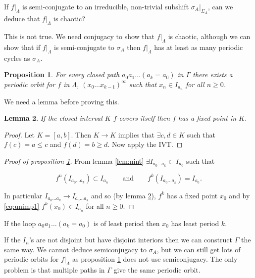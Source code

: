 \documentclass{notes}
\theoremstyle{plain}
\newtheorem{proposition}{Proposition}[chapter]
\newtheorem{lemma}[proposition]{Lemma}
\begin{document}
If $\left.f\right|_\Lambda$ is semi-conjugate to an irreducible,
non-trivial subshift $\left.\sigma_A\right|_{\Sigma_A}$, can we deduce
that $\left.f\right|_{\Lambda}$ is chaotic?

This is not true.  We need conjugacy to show that $\left.f\right|_\Lambda$
is chaotic, although we can show that if $\left.f\right|_\Lambda$ is
semi-conjugate to $\sigma_A$ then $\left.f\right|_\Lambda$ has at
least as many periodic cycles as $\sigma_A$.

\begin{proposition}\label{prop:poclosed}
For every closed path $a_0 a_1 \dots (a_k = a_0)$ in $\Gamma$ there
exists a periodic orbit for $f$ in $\Lambda$,
$(x_0\dots x_{k-1})^\infty$ such that $x_n \in I_{a_n}$ for all
$n \ge 0$.
\end{proposition}

We need a lemma before proving this.

\begin{lemma}\label{lem:fpfcov}
If the closed interval $K$ $f$-covers itself then $f$ has a fixed point in $K$.
\end{lemma}

\begin{proof}
Let $K = [a,b]$.  Then $K \to K$ implies that $\exists c,d \in K$
such that $f(c) = a \le c$ and $f(d) =b \ge d$.  Now apply the IVT.
\end{proof}

\begin{proof}[Proof of proposition \ref{prop:poclosed}]
From lemma \ref{lem:nint} $\exists I_{a_0 \dots a_k} \subset I_{a_0}$
such that

\begin{equation}\tag{$*$}\label{eq:unimp1}
f^n(I_{a_0 \dots a_k}) \subset I_{a_n} \qquad \text{and} \qquad
f^k(I_{a_0 \dots a_k}) = I_{a_0}.
\end{equation}

In particular $I_{a_0 \dots a_k} \to I_{a_0 \dots a_k}$ and
so (by lemma \ref{lem:fpfcov}), $f^k$ has a fixed point $x_0$
and by \eqref{eq:unimp1} $f^k(x_0) \in I_{a_n}$ for all $n \ge 0$.
\end{proof}

If the loop $a_0 a_1\dots (a_k = a_0)$ is of least period then
$x_0$ has least period $k$.

If the $I_n$'s are not disjoint but have disjoint interiors then
we can construct $\Gamma$ the same way.  We cannot deduce semiconjugacy
to $\sigma_A$, but we can still get lots of periodic orbits for
$\left. f\right|_\Lambda$ as proposition \ref{prop:poclosed} does not
use semiconjugacy.  The only problem is that multiple paths in $\Gamma$
give the same periodic orbit.
\end{document}

